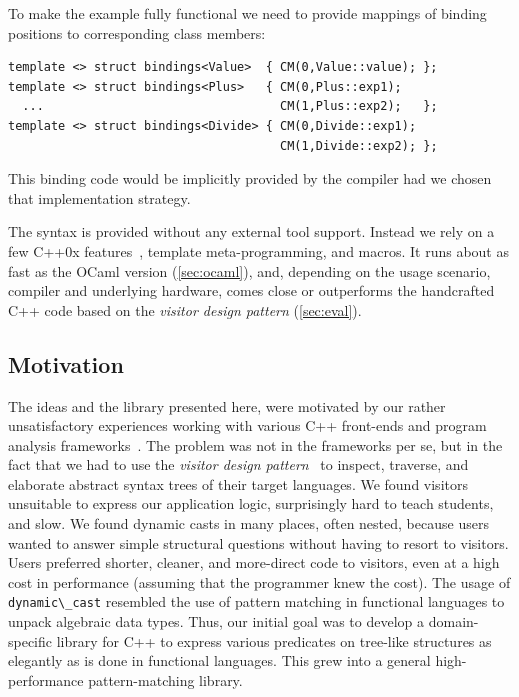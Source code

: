 \documentclass[preprint]{sigplanconf}
\makeatletter
\DeclareRobustCommand{\code}[1]{{\lstinline[breaklines=false,escapechar=@]{#1}}}
\makeatother
\begin{document}
\noindent
To make the example fully functional we need to provide mappings of binding 
positions to corresponding class members:

\begin{lstlisting}[keepspaces,columns=flexible]
template <> struct bindings<Value>  { CM(0,Value::value); };
template <> struct bindings<Plus>   { CM(0,Plus::exp1); 
  ...                                 CM(1,Plus::exp2);   };
template <> struct bindings<Divide> { CM(0,Divide::exp1); 
                                      CM(1,Divide::exp2); };
\end{lstlisting}

\noindent
This binding code would be implicitly provided by the compiler had
we chosen that implementation strategy.

The syntax is provided without any external tool support. Instead we rely on a 
few C++0x features~\cite{C++0x}, template meta-programming, and macros. It runs 
about as fast as the OCaml version (\textsection\ref{sec:ocaml}), and, depending 
on the usage scenario, compiler and underlying hardware, comes close or 
outperforms the handcrafted C++ code based on the \emph{visitor design pattern} 
(\textsection\ref{sec:eval}).

\subsection{Motivation}

The ideas and the library presented here, were motivated by our 
rather unsatisfactory experiences working with various C++ front-ends and 
program analysis frameworks~\cite{Pivot09,Phoenix,Clang,Liz}. 
The problem was not in the frameworks per se, but in the fact that we had to use
the \emph{visitor design pattern}~\cite{DesignPatterns1993} to inspect, traverse, and 
elaborate abstract syntax trees of their target languages. We found visitors 
unsuitable to express our application logic, surprisingly hard to teach 
students, and slow. We found dynamic casts in many places, often nested, 
because users wanted to answer simple structural 
questions without having to resort to visitors. Users preferred shorter, cleaner, 
and more-direct code to visitors, even at a high cost in performance (assuming 
that the programmer knew the cost). The usage of \code{dynamic\_cast} resembled 
the use of pattern matching in functional languages to unpack algebraic data 
types. Thus, our initial goal was to develop a domain-specific library for C++ 
to express various predicates on tree-like structures as elegantly as is done in functional 
languages. This grew into a general high-performance pattern-matching library.
\end{document}
